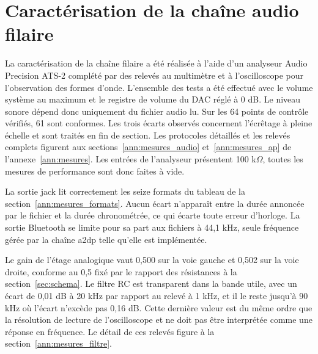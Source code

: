 \section{Caractérisation de la chaîne audio filaire}
\label{sec:res_audio}

La caractérisation de la chaîne filaire a été réalisée à l'aide d'un analyseur Audio Precision ATS-2 complété par des relevés au multimètre et à l'oscilloscope pour l'observation des formes d'onde. L'ensemble des tests a été effectué avec le volume système au maximum et le registre de volume du \gls{DAC} réglé à 0 dB. Le niveau sonore dépend donc uniquement du fichier audio lu. Sur les 64 points de contrôle vérifiés, 61 sont conformes. Les trois écarts observés concernent l'écrêtage à pleine échelle et sont traités en fin de section. Les protocoles détaillés et les relevés complets figurent aux sections~\ref{ann:mesures_audio} et~\ref{ann:mesures_ap} de l'annexe~\ref{ann:mesures}. Les entrées de l'analyseur présentent 100 k$\Omega$, toutes les mesures de performance sont donc faites à vide.

La sortie jack lit correctement les seize formats du tableau de la section~\ref{ann:mesures_formats}. Aucun écart n'apparaît entre la durée annoncée par le fichier et la durée chronométrée, ce qui écarte toute erreur d'horloge. La sortie Bluetooth se limite pour sa part aux fichiers à 44,1 kHz, seule fréquence gérée par la chaîne \gls{a2dp} telle qu'elle est implémentée.

Le gain de l'étage analogique vaut 0,500 sur la voie gauche et 0,502 sur la voie droite, conforme au 0,5 fixé par le rapport des résistances à la section~\ref{sec:schema}. Le filtre RC est transparent dans la bande utile, avec un écart de 0,01 dB à 20 kHz par rapport au relevé à 1 kHz, et il le reste jusqu'à 90 kHz où l'écart n'excède pas 0,16 dB. Cette dernière valeur est du même ordre que la résolution de lecture de l'oscilloscope et ne doit pas être interprétée comme une réponse en fréquence. Le détail de ces relevés figure à la section~\ref{ann:mesures_filtre}.

